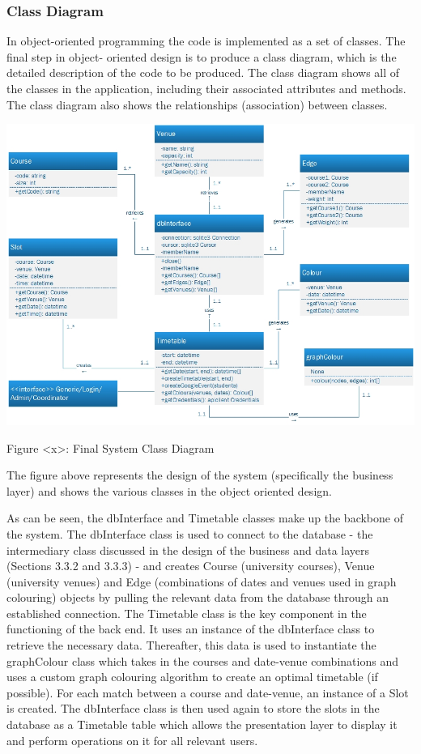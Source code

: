 \documentclass{article}
\begin{document}
\subsubsection{Class Diagram}

In object-oriented programming the code is implemented as a set of classes. The final step in object-
oriented design is to produce a class diagram, which is the detailed description of the code to be produced.
The class diagram shows all of the classes in the application, including their associated attributes and
methods. The class diagram also shows the relationships (association) between classes.
\bigskip

\centerline{\includegraphics[scale=0.7]{ClassDiagram}}
Figure <x>: Final System Class Diagram

The figure above represents the design of the system (specifically the business layer) and shows the various classes in the object oriented design.

As can be seen, the dbInterface and Timetable classes make up the backbone of the system. The dbInterface class is used to connect to the database - the intermediary class discussed in the design of the business and data layers (Sections 3.3.2 and 3.3.3) - and creates Course (university courses), Venue (university venues) and Edge (combinations of dates and venues used in graph colouring) objects by pulling the relevant data from the database through an established connection. The Timetable class is the key component in the functioning of the back end. It uses an instance of the dbInterface class to retrieve the necessary data. Thereafter, this data is used to instantiate the graphColour class which takes in the courses and date-venue combinations and uses a custom graph colouring algorithm to create an optimal timetable (if possible). For each match between a course and date-venue, an instance of a Slot is created. The dbInterface class is then used again to store the slots in the database as a Timetable table which allows the presentation layer to display it and perform operations on it for all relevant users.
\end{document}
